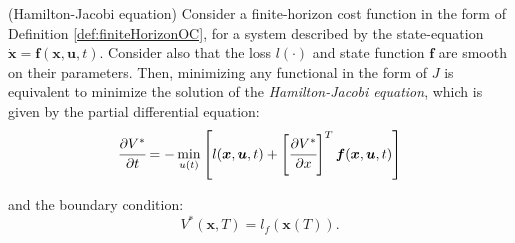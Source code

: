 \documentclass[a4paper,11pt]{book}
\numberwithin{figure}{chapter}
\numberwithin{equation}{chapter}
\numberwithin{table}{chapter}
\newtheorem{theorem}{Theorem}[chapter]
\theoremstyle{definition}
\newcounter{boxed-theorem}
\newenvironment{boxed-theorem}[1]
{\begin{shaded} \begin{theorem}{#1}}
{\end{theorem} \end{shaded}}
\newcounter{boxed-definition}
\begin{document}
\begin{boxed-theorem}{(Hamilton-Jacobi equation)} \label{th:hamiltonJacobi}
    Consider a finite-horizon cost function in the form of Definition \ref{def:finiteHorizonOC}, for a system described by the state-equation $\dot{\bm{x}} = \bm{f}(\bm{x}, \bm{u}, t)$. Consider also that the loss $l(\cdot)$ and state function $\bm{f}$ are smooth on their parameters. Then, minimizing any functional in the form of $J$ is equivalent to minimize the solution of the \textit{Hamilton-Jacobi equation}, which is given by the partial differential equation:
    \begin{equation} \label{eq:HJEquation}
        \cfrac{\partial V^*}{\partial t} = - \min_{u(t)} \left[ l(\bm{x}, \bm{u}, t) + \left[ \cfrac{\partial V^*}{\partial x} \right]^T \bm{f}(\bm{x}, \bm{u}, t)  \right]
    \end{equation}
    
    \noindent and the boundary condition:
    \begin{equation}
        V^*(\bm{x}, T) = l_f(\bm{x}(T))
    .\end{equation}
\end{boxed-theorem}
\end{document}
